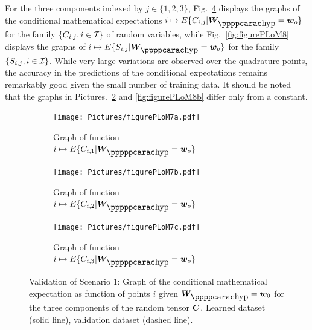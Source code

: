 For the three components indexed by $j\in\{1,2,3\}$, Fig.~\ref{fig:figurePLoM7} displays the graphs of the conditional mathematical expectations 
$i\mapsto E\{ C_{i,j} \vert \bfW_\hypp = \bfw_o \}$  for the family  $\{C_{i,j},i\in{\mathcal{I}}\}$ of random variables, while Fig.~\ref{fig:figurePLoM8} displays the graphs of $i\mapsto E\{ S_{i,j} \vert \bfW_\hypp = \bfw_o \}$  for the family  $\{S_{i,j},i\in{\mathcal{I}}\}$. While very large variations are observed over the quadrature points, the accuracy in the predictions of the conditional expectations remains remarkably good given the small number of training data. It should be noted that the graphs in Pictures.~\ref{fig:figurePLoM7b} and \ref{fig:figurePLoM8b} differ only from a constant.\\
\begin{figure}[!htb]
    \centering
    \begin{subfigure}[b]{0.33\textwidth}
    \centering
        \texttt{[image: Pictures/figurePLoM7a.pdf]}
        \caption{Graph of function $i\mapsto E\{ C_{i,1} \vert \bfW_\hyppp = \bfw_o \}$}
        \label{fig:figurePLoM7a}
    \end{subfigure}
    \centering
    \begin{subfigure}[b]{0.33\textwidth}
    \centering
        \texttt{[image: Pictures/figurePLoM7b.pdf]}
        \caption{Graph of function $i\mapsto E\{ C_{i,2} \vert \bfW_\hyppp = \bfw_o \}$}
        \label{fig:figurePLoM7b}
    \end{subfigure}
    \centering
    \begin{subfigure}[b]{0.33\textwidth}
    \centering
        \texttt{[image: Pictures/figurePLoM7c.pdf]}
        \caption{Graph of function $i\mapsto E\{ C_{i,3} \vert \bfW_\hyppp = \bfw_o \}$}
        \label{fig:figurePLoM7c}
    \end{subfigure}
    \caption{Validation of Scenario 1: Graph of the conditional mathematical expectation as function of points $i$ given $\bfW_\hypp =\bfw_0$ for the three components of the random tensor ${\boldsymbol{C}}$.  Learned dataset (solid line), validation dataset (dashed line).}
    \label{fig:figurePLoM7}
\end{figure}
%
